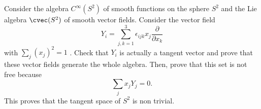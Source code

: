 \begin{exercice}\label{exo017}
Consider the algebra $ C^{\infty}(S^{2})$ of smooth functions on the sphere $S^{2}$ and the Lie algebra $\cvec(S^{2})$ of smooth vector fields. Consider the vector field
\[ 
  Y_{i}=\sum_{j,k=1}^{3}\epsilon_{ijk}x_{j}\frac{ \partial }{ \partial x_{k} }
\]
with $\sum_{j}(x_{j})^{2}=1$ .
Check that $Y_{i}$ is actually a tangent vector and prove that these vector fields generate the whole algebra.  Then, prove that this set is not free because
\[ 
  \sum_{j}x_{j}Y_{j}=0.
\]
This proves that the tangent space of $S^{2}$ is non trivial.
\end{exercice}
